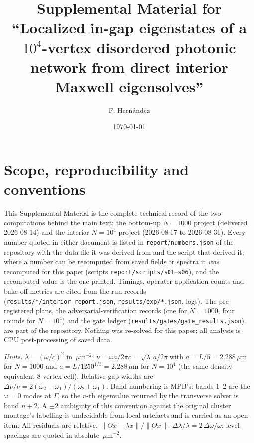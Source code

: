 \documentclass[aps,prl,preprint,superscriptaddress,longbibliography,nofootinbib]{revtex4-2}
\newcommand{\um}{\,\mu\mathrm{m}}
\newcommand{\umi}{\,\mu\mathrm{m}^{-2}}
\begin{document}
\title{Supplemental Material for ``Localized in-gap eigenstates of a $10^4$-vertex disordered photonic network from direct interior Maxwell eigensolves''}
\author{F. Hern\'andez}
\date{\today}
\maketitle

\tableofcontents

\section{Scope, reproducibility and conventions}
This Supplemental Material is the complete technical record of the two computations behind the main text: the bottom-up $N=1000$ project (delivered 2026-08-14) and the interior $N=10^4$ project (2026-08-17 to 2026-08-31). Every number quoted in either document is listed in \texttt{report/numbers.json} of the repository with the data file it was derived from and the script that derived it; where a number can be recomputed from saved fields or spectra it \emph{was} recomputed for this paper (scripts \texttt{report/scripts/s01}--\texttt{s06}), and the recomputed value is the one printed. Timings, operator-application counts and bake-off metrics are cited from the run records (\texttt{results/*/interior\_report.json}, \texttt{results/exp/*.json}, logs). The pre-registered plans, the adversarial-verification records (one for $N=1000$, four rounds for $N=10^4$) and the gate ledger (\texttt{results/gates/gate\_results.json}) are part of the repository. Nothing was re-solved for this paper; all analysis is CPU post-processing of saved data.

\emph{Units.} $\lambda=(\omega/c)^2$ in $\umi$; $\nu=\omega a/2\pi c=\sqrt{\lambda}\,a/2\pi$ with $a=L/5=2.288\um$ for $N=1000$ and $a=L/1250^{1/3}=2.288\um$ for $N=10^4$ (the same density-equivalent 8-vertex cell). Relative gap widths are $\Delta\nu/\nu=2(\omega_2-\omega_1)/(\omega_2+\omega_1)$. Band numbering is MPB's: bands 1--2 are the $\omega=0$ modes at $\Gamma$, so the $n$-th eigenvalue returned by the transverse solver is band $n+2$. A $\pm2$ ambiguity of this convention against the original cluster montage's labelling is undecidable from local artefacts and is carried as an open item. All residuals are relative, $\|\Theta x-\lambda x\|/\|\Theta x\|$; $\Delta\lambda/\lambda=2\,\Delta\omega/\omega$; level spacings are quoted in absolute $\umi$.
\end{document}
